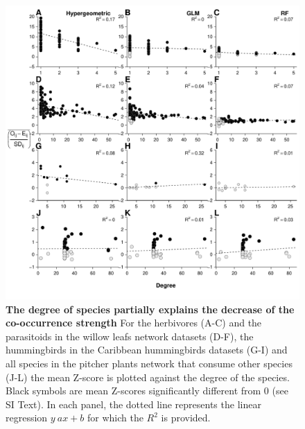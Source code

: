 \newpage

\begin{figure}[htbp]
\centering
\includegraphics{chapitre3/figS7.pdf}
\caption{\textbf{The degree of species partially explains the decrease
of the co-occurrence strength} For the herbivores (A-C) and the
parasitoids in the willow leafs network datasets (D-F), the hummingbirds
in the Caribbean hummingbirds datasets (G-I) and all species in the
pitcher plants network that consume other species (J-L) the mean Z-score
is plotted against the degree of the species. Black symbols are mean
Z-scores significantly different from 0 (see SI Text). In each panel,
the dotted line represents the linear regression \(y~ax+b\) for which
the \(R^2\) is provided.\label{fig:degree}}
\end{figure}

\newpage

